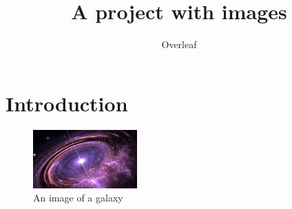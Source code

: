 \documentclass{article}
\title{A project with images}
\author{Overleaf}
\date{}
\begin{document}
\maketitle

\section{Introduction}
\begin{figure}[htp]
    \centering
    \includegraphics[width=4cm]{Universe}
    \caption{An image of a galaxy}
    \label{fig:galaxy}
\end{figure}
\end{document}
